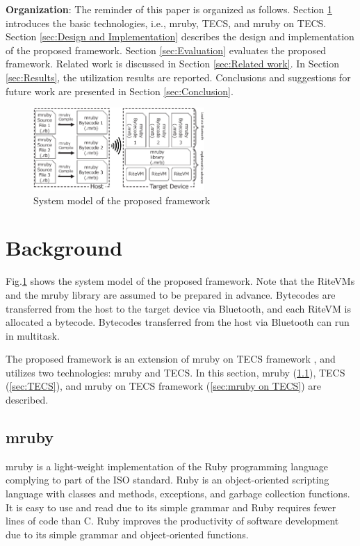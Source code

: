 \documentclass[S,R,E]{article/compsoft}
\begin{document}
{\bf Organization}: The reminder of this paper is organized as follows.
Section \ref{sec:Background} introduces the basic technologies, i.e., mruby, TECS, and mruby on TECS.
Section \ref{sec:Design and Implementation} describes the design and implementation of the proposed framework.
Section \ref{sec:Evaluation} evaluates the proposed framework.
Related work is discussed in Section \ref{sec:Related work}.
In Section \ref{sec:Results}, the utilization results are reported.
Conclusions and suggestions for future work are presented in Section \ref{sec:Conclusion}.


\begin{figure}[t]
    \centering
    \includegraphics[width=6.5cm,clip]{figure/proposed.eps}
    \caption{System model of the proposed framework}
    \label{fig:proposed}
\end{figure}

\section{Background}
\label{sec:Background}
Fig.\ref{fig:proposed} shows the system model of the proposed framework.
Note that the RiteVMs and the mruby library are assumed to be prepared in advance.
Bytecodes are transferred from the host to the target device via Bluetooth, and each RiteVM is allocated a bytecode.
Bytecodes transferred from the host via Bluetooth can run in multitask.

The proposed framework is an extension of mruby on TECS framework \cite{par:mrubyonTECS}, and utilizes two technologies: mruby and TECS.
In this section, mruby (\ref{sec:mruby}), TECS (\ref{sec:TECS}), and mruby on TECS framework (\ref{sec:mruby on TECS}) are described.

\subsection{mruby}
\label{sec:mruby}
mruby is a light-weight implementation of the Ruby programming language complying to part of the ISO standard.
Ruby is an object-oriented scripting language \cite{url:Ruby} with classes and methods, exceptions, and garbage collection functions.
It is easy to use and read due to its simple grammar and Ruby requires fewer lines of code than C.
Ruby improves the productivity of software development due to its simple grammar and object-oriented functions.
\end{document}
